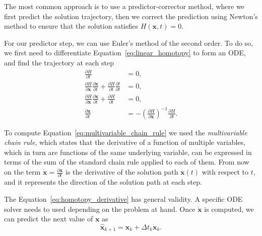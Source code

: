 The most common approach is to use a predictor-corrector method, where we first predict the solution trajectory, then we correct the prediction using Newton's method to ensure that the solution satisfies \(H(\mathbf{x},t)=0\).

For our predictor step, we can use Euler's method of the second order.
To do so, we first need to differentiate Equation~\ref{eq:linear_homotopy} to form an ODE, and find the trajectory at each step
\begin{align}
\frac{\partial H}{\partial t} &= 0, \\
\frac{\partial H}{\partial \mathbf{x}} \frac{\partial \mathbf{x}}{\partial t} + \frac{\partial H}{\partial t} \frac{\partial t}{\partial t} &= 0, \label{eq:multivariable_chain_rule} \\
\frac{\partial H}{\partial \mathbf{x}} \frac{\partial \mathbf{x}}{\partial t} + \frac{\partial H}{\partial t} &= 0, \\
\frac{\partial \mathbf{x}}{\partial t} &= -\left(\frac{\partial H}{\partial \mathbf{x}}\right)^{-1} \frac{\partial H}{\partial t}. \label{eq:homotopy_derivative}
\end{align}

To compute Equation~\ref{eq:multivariable_chain_rule} we used the \emph{multivariable chain rule}, which states that the derivative of a function of multiple variables, which in turn are functions of the same underlying variable, can be expressed in terms of the sum of the standard chain rule applied to each of them. From now on the term \(\dot{\mathbf{x}} = \frac{\partial \mathbf{x}}{\partial t}\) is the derivative of the solution path \(\mathbf{x}(t)\) with respect to \(t\), and it represents the direction of the solution path at each step.

The Equation~\ref{eq:homotopy_derivative} has general validity. A specific ODE solver needs to used depending on the problem at hand. Once \(\dot{\mathbf{x}}\) is computed, we can predict the next value of \(\mathbf{x}\) as
\[
\hat{\mathbf{x}}_{k+1} = \mathbf{x}_k + \Delta t_k \dot{\mathbf{x}}_k.
\label{eq:predictor_step}
\]

